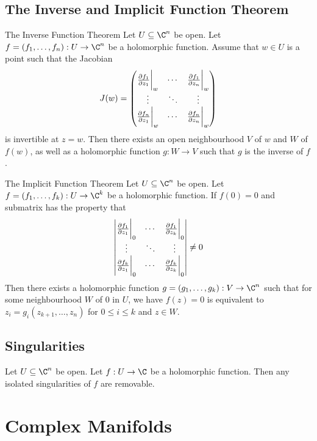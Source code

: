 \documentclass[a4paper]{article}
\begin{document}
\subsection{The Inverse and Implicit Function Theorem}
\begin{thm}{The Inverse Function Theorem}{} Let $U\subseteq\C^n$ be open. Let $f=(f_1,\dots,f_n):U\to\C^n$ be a holomorphic function. Assume that $w\in U$ is a point such that the Jacobian $$J(w)=\begin{pmatrix}
\frac{\partial f_1}{\partial z_1}\bigg{|}_{w} & \cdots & \frac{\partial f_1}{\partial z_n}\bigg{|}_{w}\\
\vdots & \ddots & \vdots\\
\frac{\partial f_n}{\partial z_1}\bigg{|}_{w} & \cdots & \frac{\partial f_n}{\partial z_n}\bigg{|}_{w}
\end{pmatrix}$$ is invertible at $z=w$. Then there exists an open neighbourhood $V$ of $w$ and $W$ of $f(w)$, as well as a holomorphic function $g:W\to V$ such that $g$ is the inverse of $f$. 
\end{thm}

\begin{thm}{The Implicit Function Theorem}{} Let $U\subseteq\C^n$ be open. Let $f=(f_1,\dots,f_k):U\to\C^k$ be a holomorphic function. If $f(0)=0$ and submatrix has the property that $$\begin{vmatrix}
\frac{\partial f_1}{\partial z_1}\bigg{|}_{0} & \cdots & \frac{\partial f_1}{\partial z_k}\bigg{|}_{0}\\
\vdots & \ddots & \vdots\\
\frac{\partial f_k}{\partial z_1}\bigg{|}_{0} & \cdots & \frac{\partial f_k}{\partial z_k}\bigg{|}_{0}
\end{vmatrix}\neq 0$$ Then there exists a holomorphic function $g=(g_1,\dots,g_k):V\to\C^n$ such that for some neighbourhood $W$ of $0$ in $U$, we have $f(z)=0$ is equivalent to $z_i=g_i(z_{k+1},\dots,z_n)$ for $0\leq i\leq k$ and $z\in W$. 
\end{thm}

\subsection{Singularities}
\begin{thm}{}{} Let $U\subseteq\C^n$ be open. Let $f:U\to\C$ be a holomorphic function. Then any isolated singularities of $f$ are removable. 
\end{thm}

\pagebreak
\section{Complex Manifolds}
\end{document}
